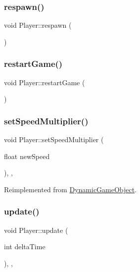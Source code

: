\subsubsection{\texorpdfstring{respawn()}{respawn()}}
{\footnotesize\ttfamily void Player\+::respawn (\begin{DoxyParamCaption}{ }\end{DoxyParamCaption})\hspace{0.3cm}{\ttfamily [inline]}}

\mbox{\label{class_player_a41f9e4a4e55ee3fc38614dcb965193a1}} 
\subsubsection{\texorpdfstring{restart\+Game()}{restartGame()}}
{\footnotesize\ttfamily void Player\+::restart\+Game (\begin{DoxyParamCaption}{ }\end{DoxyParamCaption})\hspace{0.3cm}{\ttfamily [inline]}}

\mbox{\label{class_player_a9098e6b411ea9102b02bb911eca6515b}} 
\subsubsection{\texorpdfstring{set\+Speed\+Multiplier()}{setSpeedMultiplier()}}
{\footnotesize\ttfamily void Player\+::set\+Speed\+Multiplier (\begin{DoxyParamCaption}\item[{float}]{new\+Speed }\end{DoxyParamCaption})\hspace{0.3cm}{\ttfamily [inline]}, {\ttfamily [final]}, {\ttfamily [virtual]}}



Reimplemented from \hyperlink{class_dynamic_game_object_a7bf254357b0d2491044d175afdc36ca4}{Dynamic\+Game\+Object}.

\mbox{\label{class_player_a51e705a6ad3628144e02832d1839b360}} 
\subsubsection{\texorpdfstring{update()}{update()}}
{\footnotesize\ttfamily void Player\+::update (\begin{DoxyParamCaption}\item[{int}]{delta\+Time }\end{DoxyParamCaption})\hspace{0.3cm}{\ttfamily [inline]}, {\ttfamily [final]}, {\ttfamily [virtual]}}




